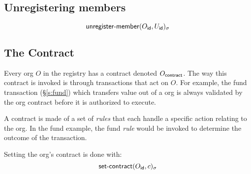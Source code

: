 \subsection{Unregistering members}
\[
    \operatorname{\mathsf{unregister-member}}\lparen O_{\mathsf{id}}, U_{\mathsf{id}}\rparen_\sigma
\]


\subsection{The Contract}
Every org $O$ in the registry has a contract denoted $O_{\mathsf{contract}}$.
The way this contract is invoked is through transactions that act on $O$. For
example, the \textsf{fund} transaction (\S\ref{s:fund}) which transfers value
out of a org is always validated by the org contract before it
is authorized to execute.

A contract is made of a set of \emph{rules} that each handle a specific action
relating to the org. In the \textsf{fund} example, the \textsf{fund}
\emph{rule} would be invoked to determine the outcome of the transaction.

Setting the org's contract is done with:
\[
    \operatorname{\mathsf{set-contract}}\lparen O_{\mathsf{id}}, c\rparen_\sigma
\]


